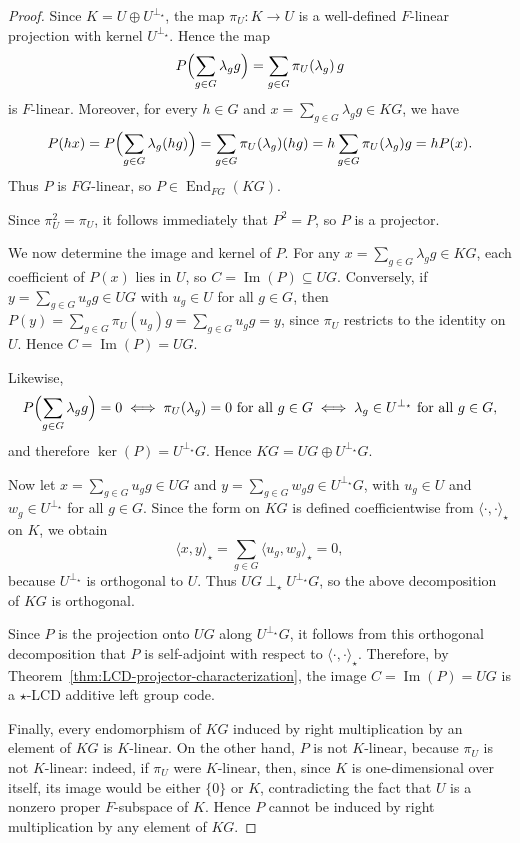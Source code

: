 \documentclass[11pt]{article}
\begin{document}
\begin{proof}
Since $K=U\oplus U^{\perp_\star}$, the map $\pi_U:K\longrightarrow U$ is a well-defined $F$-linear projection with kernel $U^{\perp_\star}$. Hence the map
$$
P\Bigl(\sum_{g\in G}\lambda_g g\Bigr)=\sum_{g\in G}\pi_U(\lambda_g)\,g
$$
is $F$-linear. Moreover, for every $h\in G$ and $x=\sum_{g\in G}\lambda_g g\in KG$, we have
$$
P(hx)=P\Bigl(\sum_{g\in G}\lambda_g(hg)\Bigr)=\sum_{g\in G}\pi_U(\lambda_g)(hg)=h\sum_{g\in G}\pi_U(\lambda_g)g=hP(x).
$$
Thus $P$ is $FG$-linear, so $P\in \operatorname{End}_{FG}(KG)$.

Since $\pi_U^2=\pi_U$, it follows immediately that $P^2=P$, so $P$ is a projector.

We now determine the image and kernel of $P$. For any $x=\sum_{g\in G}\lambda_g g\in KG$, each coefficient of $P(x)$ lies in $U$, so $C=\operatorname{Im}(P)\subseteq UG$. Conversely, if $y=\sum_{g\in G}u_g g\in UG$ with $u_g\in U$ for all $g\in G$, then $P(y)=\sum_{g\in G}\pi_U(u_g)g=\sum_{g\in G}u_g g=y$, since $\pi_U$ restricts to the identity on $U$. Hence $C=\operatorname{Im}(P)=UG$.

Likewise,
$$
P\Bigl(\sum_{g\in G}\lambda_g g\Bigr)=0
\iff
\pi_U(\lambda_g)=0 \text{ for all } g\in G
\iff
\lambda_g\in U^{\perp_\star} \text{ for all } g\in G,
$$
and therefore $\ker(P)=U^{\perp_\star}G$. Hence $KG=UG\oplus U^{\perp_\star}G$.

Now let $x=\sum_{g\in G}u_g g\in UG$ and $y=\sum_{g\in G}w_g g\in U^{\perp_\star}G$, with $u_g\in U$ and $w_g\in U^{\perp_\star}$ for all $g\in G$. Since the form on $KG$ is defined coefficientwise from $\langle\cdot,\cdot\rangle_\star$ on $K$, we obtain
$$
\langle x,y\rangle_\star=\sum_{g\in G}\langle u_g,w_g\rangle_\star=0,
$$
because $U^{\perp_\star}$ is orthogonal to $U$. Thus $UG\perp_\star U^{\perp_\star}G$, so the above decomposition of $KG$ is orthogonal.

Since $P$ is the projection onto $UG$ along $U^{\perp_\star}G$, it follows from this orthogonal decomposition that $P$ is self-adjoint with respect to $\langle\cdot,\cdot\rangle_\star$. Therefore, by Theorem~\ref{thm:LCD-projector-characterization}, the image $C=\operatorname{Im}(P)=UG$ is a $\star$-LCD additive left group code.

Finally, every endomorphism of $KG$ induced by right multiplication by an element of $KG$ is $K$-linear. On the other hand, $P$ is not $K$-linear, because $\pi_U$ is not $K$-linear: indeed, if $\pi_U$ were $K$-linear, then, since $K$ is one-dimensional over itself, its image would be either $\{0\}$ or $K$, contradicting the fact that $U$ is a nonzero proper $F$-subspace of $K$. Hence $P$ cannot be induced by right multiplication by any element of $KG$.
\end{proof}
\end{document}
